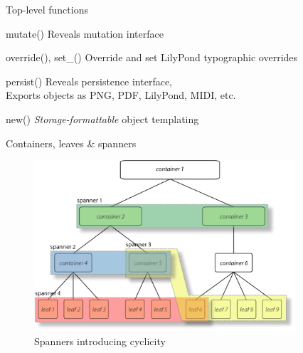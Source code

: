 \begin{frame}[fragile]{Top-level functions}
    \begin{block}{mutate()}
        Reveals mutation interface
    \end{block}
    \begin{block}{override(), set\_()}
        Override and set LilyPond typographic overrides
    \end{block}
    \begin{block}{persist()}
        Reveals persistence interface,\\
        Exports objects as PNG, PDF, LilyPond, MIDI, etc.
    \end{block}
    \begin{block}{new()}
        \emph{Storage-formattable} object templating
    \end{block}
\end{frame}

\begin{frame}{Containers, leaves \& spanners}
    \begin{figure}
    \begin{centering}
        \includegraphics[height=2.5in]{assets/include-container-spanner.png}
    \caption{Spanners introducing cyclicity}
    \end{centering}
    \end{figure}
\end{frame}

